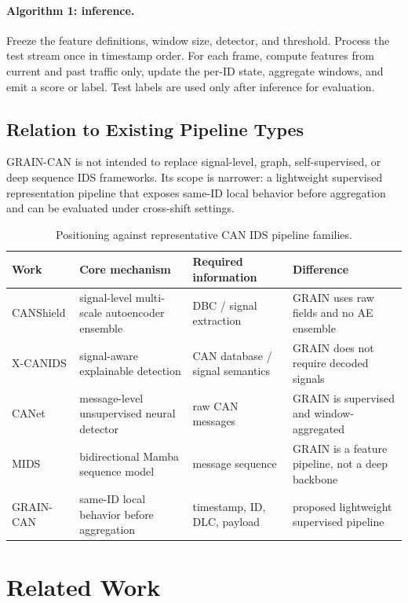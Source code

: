 \documentclass[runningheads]{llncs}
\newcommand{\method}{GRAIN-CAN}
\begin{document}
\paragraph{Algorithm 1: inference.}
Freeze the feature definitions, window size, detector, and threshold. Process the test stream once in timestamp order. For each frame, compute features from current and past traffic only, update the per-ID state, aggregate windows, and emit a score or label. Test labels are used only after inference for evaluation.

\subsection{Relation to Existing Pipeline Types}
\method{} is not intended to replace signal-level, graph, self-supervised, or deep sequence IDS frameworks. Its scope is narrower: a lightweight supervised representation pipeline that exposes same-ID local behavior before aggregation and can be evaluated under cross-shift settings.
\begin{table}[H]
\caption{Positioning against representative CAN IDS pipeline families.}\label{tab:positioning}
\centering\small
\setlength{\tabcolsep}{3pt}
\begin{tabular}{>{\raggedright\arraybackslash}p{}>{\raggedright\arraybackslash}p{}>{\raggedright\arraybackslash}p{}>{\raggedright\arraybackslash}p{}}
\hline
Work & Core mechanism & Required information & Difference \\
\hline
CANShield & signal-level multi-scale autoencoder ensemble & DBC / signal extraction & GRAIN uses raw fields and no AE ensemble \\
X-CANIDS & signal-aware explainable detection & CAN database / signal semantics & GRAIN does not require decoded signals \\
CANet & message-level unsupervised neural detector & raw CAN messages & GRAIN is supervised and window-aggregated \\
MIDS & bidirectional Mamba sequence model & message sequence & GRAIN is a feature pipeline, not a deep backbone \\
GRAIN-CAN & same-ID local behavior before aggregation & timestamp, ID, DLC, payload & proposed lightweight supervised pipeline \\
\hline
\end{tabular}
\end{table}

\section{Related Work}
\end{document}

